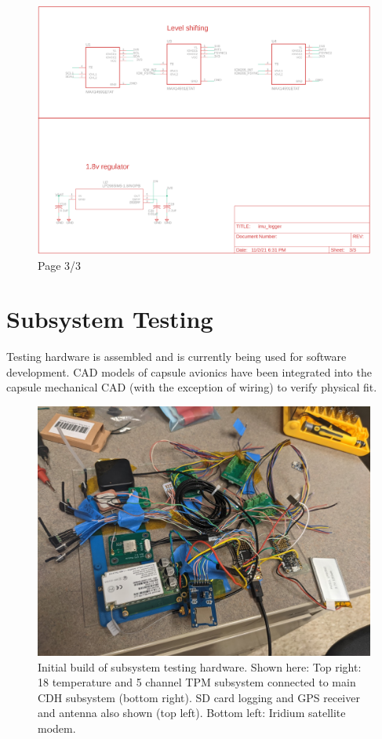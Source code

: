 \documentclass{article}
\begin{document}
\begin{figure}[H]
	\centering
	\includegraphics[width=\textwidth]{images/imu_logger_schem_3}
	\caption{Page 3/3}
	\label{fig:schematic-imu-p3}
\end{figure}





\section{Subsystem Testing}
\label{appb}

Testing hardware is assembled and is currently being used for software development. CAD models of capsule avionics have been integrated into the capsule mechanical CAD (with the exception of wiring) to verify physical fit.  

\begin{figure}[h!]
	\includegraphics[width=\textwidth]{images/subsystem-hardware.jpg}
	\caption{Initial build of subsystem testing hardware. Shown here: Top right: 18 temperature and 5 channel TPM subsystem connected to main CDH subsystem (bottom right). SD card logging and GPS receiver and antenna also shown (top left). Bottom left: Iridium satellite modem.}
	\label{fig:subsystem-hardware}
\end{figure}
\end{document}
